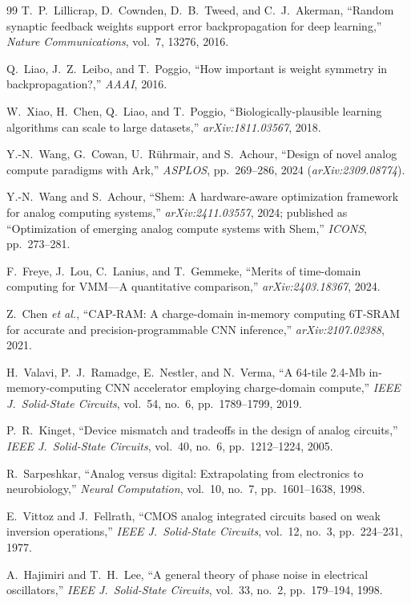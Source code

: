 \documentclass[11pt]{article}
\begin{document}
\begin{thebibliography}{99}
 T.~P.~Lillicrap, D.~Cownden, D.~B.~Tweed, and C.~J.~Akerman, ``Random synaptic feedback weights support error backpropagation for deep learning,'' \textit{Nature Communications}, vol.~7, 13276, 2016.

 Q.~Liao, J.~Z.~Leibo, and T.~Poggio, ``How important is weight symmetry in backpropagation?,'' \textit{AAAI}, 2016.

 W.~Xiao, H.~Chen, Q.~Liao, and T.~Poggio, ``Biologically-plausible learning algorithms can scale to large datasets,'' \textit{arXiv:1811.03567}, 2018.

 Y.-N.~Wang, G.~Cowan, U.~R\"uhrmair, and S.~Achour, ``Design of novel analog compute paradigms with Ark,'' \textit{ASPLOS}, pp.~269--286, 2024 (\textit{arXiv:2309.08774}).

 Y.-N.~Wang and S.~Achour, ``Shem: A hardware-aware optimization framework for analog computing systems,'' \textit{arXiv:2411.03557}, 2024; published as ``Optimization of emerging analog compute systems with Shem,'' \textit{ICONS}, pp.~273--281.

 F.~Freye, J.~Lou, C.~Lanius, and T.~Gemmeke, ``Merits of time-domain computing for VMM---A quantitative comparison,'' \textit{arXiv:2403.18367}, 2024.

 Z.~Chen \textit{et al.}, ``CAP-RAM: A charge-domain in-memory computing 6T-SRAM for accurate and precision-programmable CNN inference,'' \textit{arXiv:2107.02388}, 2021.

 H.~Valavi, P.~J.~Ramadge, E.~Nestler, and N.~Verma, ``A 64-tile 2.4-Mb in-memory-computing CNN accelerator employing charge-domain compute,'' \textit{IEEE J.\ Solid-State Circuits}, vol.~54, no.~6, pp.~1789--1799, 2019.

 P.~R.~Kinget, ``Device mismatch and tradeoffs in the design of analog circuits,'' \textit{IEEE J.\ Solid-State Circuits}, vol.~40, no.~6, pp.~1212--1224, 2005.

 R.~Sarpeshkar, ``Analog versus digital: Extrapolating from electronics to neurobiology,'' \textit{Neural Computation}, vol.~10, no.~7, pp.~1601--1638, 1998.

 E.~Vittoz and J.~Fellrath, ``CMOS analog integrated circuits based on weak inversion operations,'' \textit{IEEE J.\ Solid-State Circuits}, vol.~12, no.~3, pp.~224--231, 1977.

 A.~Hajimiri and T.~H.~Lee, ``A general theory of phase noise in electrical oscillators,'' \textit{IEEE J.\ Solid-State Circuits}, vol.~33, no.~2, pp.~179--194, 1998.


\end{thebibliography}
\end{document}
